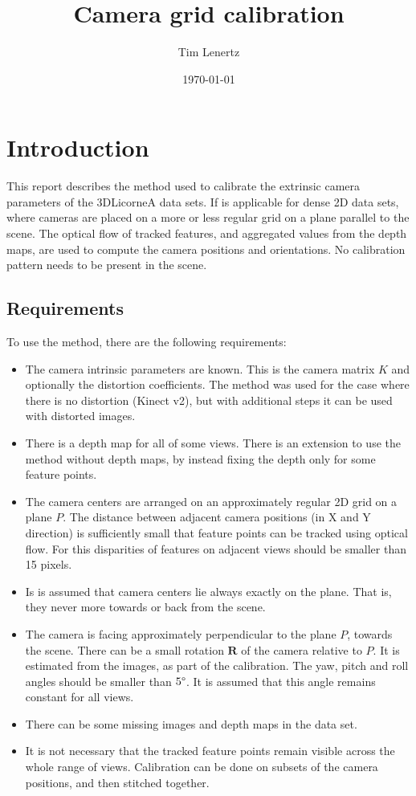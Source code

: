 \documentclass{scrreprt}
\title{Camera grid calibration}
\author{Tim Lenertz}
\date{\today}
\newcommand{\matr}[1]{\mathbf{#1}}
\begin{document}
\maketitle

\chapter{Introduction}
This report describes the method used to calibrate the extrinsic camera parameters of the 3DLicorneA data sets. If is applicable for dense 2D data sets, where cameras are placed on a more or less regular grid on a plane parallel to the scene. The optical flow of tracked features, and aggregated values from the depth maps, are used to compute the camera positions and orientations. No calibration pattern needs to be present in the scene.

\section{Requirements}
To use the method, there are the following requirements:
\begin{itemize}
\item The camera intrinsic parameters are known. This is the camera matrix $K$ and optionally the distortion coefficients. The method was used for the case where there is no distortion (Kinect v2), but with additional steps it can be used with distorted images.
\item There is a depth map for all of some views. There is an extension to use the method without depth maps, by instead fixing the depth only for some feature points.
\item The camera centers are arranged on an approximately regular 2D grid on a plane $P$. The distance between adjacent camera positions (in X and Y direction) is sufficiently small that feature points can be tracked using optical flow. For this disparities of features on adjacent views should be smaller than 15 pixels.
\item Is is assumed that camera centers lie always exactly on the plane. That is, they never more towards or back from the scene. 
\item The camera is facing approximately perpendicular to the plane $P$, towards the scene. There can be a small rotation $\matr{R}$ of the camera relative to $P$. It is estimated from the images, as part of the calibration. The yaw, pitch and roll angles should be smaller than $5\degree$. It is assumed that this angle remains constant for all views.
\item There can be some missing images and depth maps in the data set.
\item It is not necessary that the tracked feature points remain visible across the whole range of views. Calibration can be done on subsets of the camera positions, and then stitched together.
\end{itemize}
\end{document}
